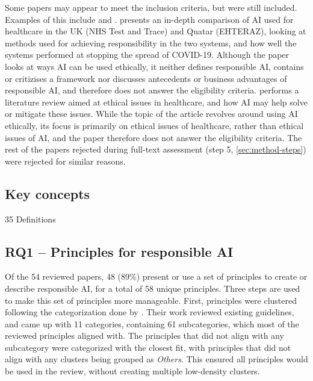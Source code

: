 Some papers may appear to meet the inclusion criteria, but were still included. Examples of this include \textcite{ElHaddadeh_2021} and \textcite{Trocin_2021}. \textcite{ElHaddadeh_2021} presents an in-depth comparison of AI used for healthcare in the UK (NHS Test and Trace) and Quatar (EHTERAZ), looking at methods used for achieving responsibility in the two systems, and how well the systems performed at stopping the spread of COVID-19. Although the paper looks at ways AI can be used ethically, it neither defines responsible AI, contains or critizises a framework nor discusses antecedents or business advantages of responsible AI, and therefore does not answer the eligibility criteria. \textcite{Trocin_2021} performs a literature review aimed at ethical issues in healthcare, and how AI may help solve or mitigate these issues. While the topic of the article revolves around using AI ethically, its focus is primarily on ethical issues of healthcare, rather than ethical issues of AI, and the paper therefore does not answer the eligibility criteria. The rest of the papers rejected during full-text assessment (step 5, \autoref{sec:method-steps}) were rejected for similar reasons.


\subsection{Key concepts}
{35 Definitions}


\subsection{RQ1 -- Principles for responsible AI}
\label{sec:results-rq1}
Of the 54 reviewed papers, 48 (89\%) present or use a set of principles to create or describe responsible AI, for a total of 58 unique principles. Three steps are used to make this set of principles more manageable. First, principles were clustered following the categorization done by \textcite{Ryan_2021}. Their work reviewed existing guidelines, and came up with 11 categories, containing 61 subcategories, which most of the reviewed principles aligned with. The principles that did not align with any subcategory were categorized with the closest fit, with principles that did not align with any clusters being grouped as \textit{Others}. This ensured all principles would be used in the review, without creating multiple low-density clusters.

